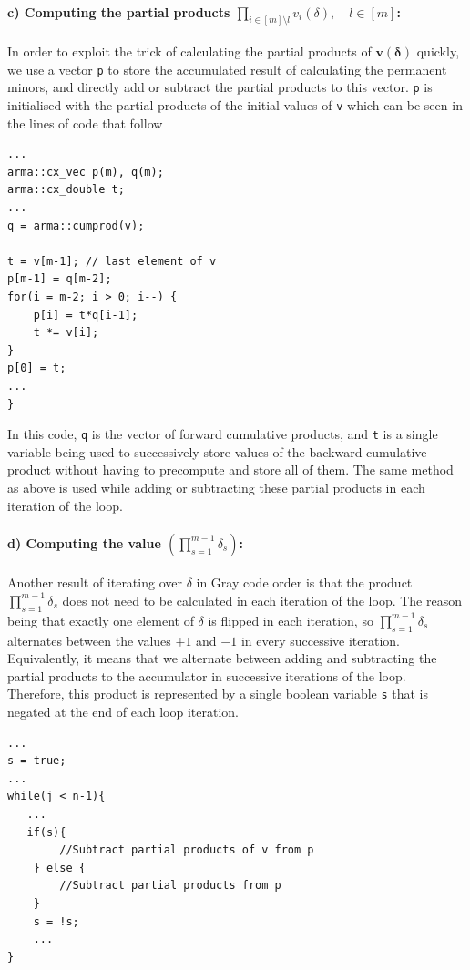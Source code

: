 \documentclass[11pt]{article}
\theoremstyle{theorem}
\theoremstyle{remark}
\theoremstyle{plain}
\theoremstyle{definition}
\begin{document}
\paragraph{c) Computing the partial products $\prod_{i \in [m] \setminus l} v_i (\delta), \quad l \in [m]$:} In order to exploit the trick of calculating the partial products of $\mathbf{v}(\mathbf{\delta})$ quickly, we use a vector \texttt{p} to store the accumulated result of calculating the permanent minors, and directly add or subtract the partial products to this vector. \texttt{p} is initialised with the partial products of the initial values of \texttt{v} which can be seen in the lines of code that follow
\begin{verbatim}
...
arma::cx_vec p(m), q(m);
arma::cx_double t;
...
q = arma::cumprod(v);

t = v[m-1];	// last element of v
p[m-1] = q[m-2];
for(i = m-2; i > 0; i--) {
    p[i] = t*q[i-1];
    t *= v[i];
}
p[0] = t;
...
}
\end{verbatim}
In this code, \texttt{q} is the vector of forward cumulative products, and  \texttt{t} is a single variable being used to successively store values of the backward cumulative product without having to precompute and store all of them. The same method as above is used while adding or subtracting these partial products in each iteration of the loop.

\paragraph{d) Computing the value $\left( \prod_{s=1}^{m-1} \delta_s \right)$:} Another result of iterating over $\delta$ in Gray code order is that the product $\prod_{s=1}^{m-1} \delta_s$ does not need to be calculated in each iteration of the loop. The reason being that exactly one element of $\delta$ is flipped in each iteration, so $\prod_{s=1}^{m-1} \delta_s$ alternates between the values $+1$ and $-1$ in every successive iteration. Equivalently, it means that we alternate between adding and subtracting the partial products to the accumulator in successive iterations of the loop. Therefore, this product is represented by a single boolean variable \texttt{s} that is negated at the end of each loop iteration. %
\begin{verbatim}
...
s = true;
...
while(j < n-1){
   ...
   if(s){
        //Subtract partial products of v from p
    } else {
        //Subtract partial products from p
    }
    s = !s;
    ...
}
\end{verbatim}
\end{document}

